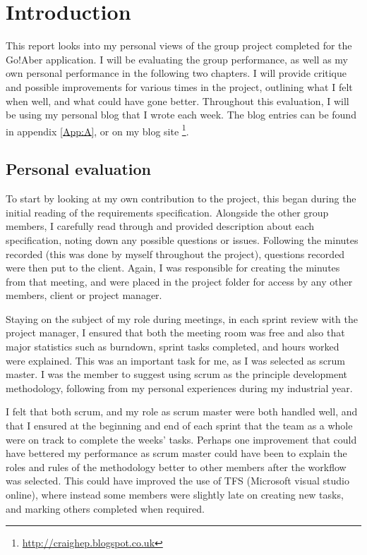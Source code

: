 \chapter{Introduction}
This report looks into my personal views of the group project completed for the Go!Aber application. I will be evaluating the group performance, as well as my own personal performance in the following two chapters. I will provide critique and possible improvements for various times in the project, outlining what I felt when well, and what could have gone better.  Throughout this evaluation, I will be using my personal blog that I wrote each week. The blog entries can be found in appendix \ref{App:A}, or on my blog site \footnote{\url{http://craighep.blogspot.co.uk}}.
\section{Personal evaluation}
To start by looking at my own contribution to the project, this began during the initial reading of the requirements specification. Alongside the other group members, I carefully read through and provided description about each specification, noting down any possible questions or issues. Following the minutes recorded (this was done by myself throughout the project), questions recorded were then put to the client. Again, I was responsible for creating the minutes from that meeting, and were placed in the project folder for access by any other members, client or project manager. \par
Staying on the subject of my role during meetings, in each sprint review with the project manager, I ensured that both the meeting room was free and also that major statistics such as burndown, sprint tasks completed, and hours worked were explained. This was an important task for me, as I was selected as scrum master. I was the member to suggest using scrum as the principle development methodology, following from my personal experiences during my industrial year. \par
I felt that both scrum, and my role as scrum master were both handled well, and that I ensured at the beginning and end of each sprint that the team as a whole were on track to complete the weeks’ tasks. Perhaps one improvement that could have bettered my performance as scrum master could have been to explain the roles and rules of the methodology better to other members after the workflow was selected. This could have improved the use of TFS (Microsoft visual studio online), where instead some members were slightly late on creating new tasks, and marking others completed when required. \par
